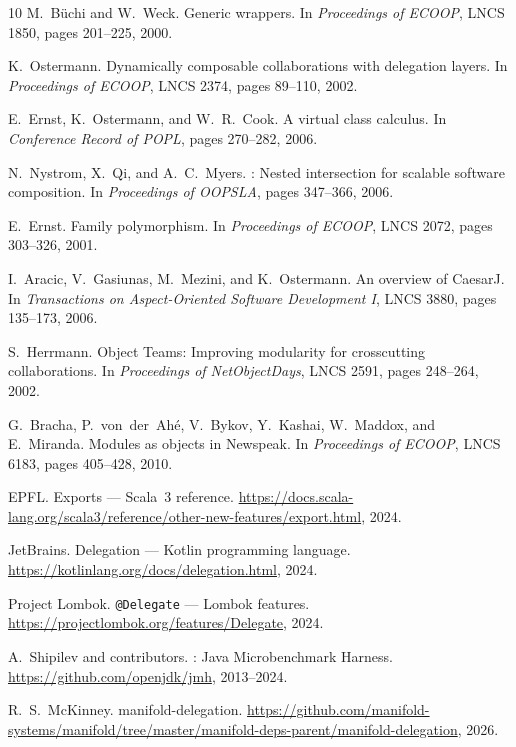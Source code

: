 \documentclass[acmsmall,nonacm]{acmart}
\theoremstyle{acmplain}
\theoremstyle{acmdefinition}
\begin{document}
\begin{thebibliography}{10}
M.~B\"uchi and W.~Weck.
\newblock Generic wrappers.
\newblock In {\em Proceedings of ECOOP}, LNCS 1850, pages 201--225, 2000.

K.~Ostermann.
\newblock Dynamically composable collaborations with delegation layers.
\newblock In {\em Proceedings of ECOOP}, LNCS 2374, pages 89--110, 2002.

E.~Ernst, K.~Ostermann, and W.~R.~Cook.
\newblock A virtual class calculus.
\newblock In {\em Conference Record of POPL}, pages 270--282, 2006.

N.~Nystrom, X.~Qi, and A.~C.~Myers.
: Nested intersection for scalable software composition.
\newblock In {\em Proceedings of OOPSLA}, pages 347--366, 2006.

E.~Ernst.
\newblock Family polymorphism.
\newblock In {\em Proceedings of ECOOP}, LNCS 2072, pages 303--326, 2001.

I.~Aracic, V.~Gasiunas, M.~Mezini, and K.~Ostermann.
\newblock An overview of {CaesarJ}.
\newblock In {\em Transactions on Aspect-Oriented Software Development I}, LNCS 3880, pages 135--173, 2006.

S.~Herrmann.
\newblock Object {Teams}: Improving modularity for crosscutting collaborations.
\newblock In {\em Proceedings of NetObjectDays}, LNCS 2591, pages 248--264, 2002.

G.~Bracha, P.~von~der~Ah{\'e}, V.~Bykov, Y.~Kashai, W.~Maddox, and E.~Miranda.
\newblock Modules as objects in {Newspeak}.
\newblock In {\em Proceedings of ECOOP}, LNCS 6183, pages 405--428, 2010.

EPFL.
\newblock Exports --- {Scala~3} reference.
\newblock \url{https://docs.scala-lang.org/scala3/reference/other-new-features/export.html}, 2024.

JetBrains.
\newblock Delegation --- {Kotlin} programming language.
\newblock \url{https://kotlinlang.org/docs/delegation.html}, 2024.

Project Lombok.
\newblock \texttt{@Delegate} --- {Lombok} features.
\newblock \url{https://projectlombok.org/features/Delegate}, 2024.

A.~Shipilev and contributors.
: Java Microbenchmark Harness.
\newblock \url{https://github.com/openjdk/jmh}, 2013--2024.

R.~S.~McKinney.
\newblock manifold-delegation.
\newblock \url{https://github.com/manifold-systems/manifold/tree/master/manifold-deps-parent/manifold-delegation}, 2026.

\end{thebibliography}
\end{document}
